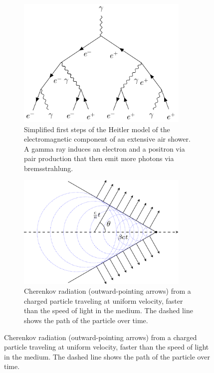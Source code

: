 \begin{figure}
    \begin{subfigure}[t]{0.45\textwidth}
        \centering
        \includegraphics[width=0.90\textwidth]{graphics/heitler_model.pdf}
        \caption{Simplified first steps of the Heitler model of the electromagnetic component of an extensive air shower.
        A gamma ray induces an electron and a positron via pair production that then emit more photons
        via bremsstrahlung.}%
        \label{fig:heitler_model}
    \end{subfigure}
    \hfill
    \begin{subfigure}[t]{0.45\textwidth}
        \centering
        \includegraphics[width=0.90\textwidth]{graphics/cherenkov_radiation.pdf}
        \caption{Cherenkov radiation (outward-pointing arrows) from a charged particle traveling at
        uniform velocity, faster than the speed of light in the medium. The dashed line shows the
        path of the particle over time.}%

\end{subfigure}
\end{figure}
